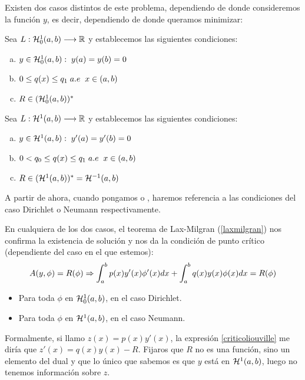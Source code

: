 Existen dos casos distintos de este problema, dependiendo de donde consideremos la función $y$, es decir, dependiendo de donde queramos minimizar:
\begin{definition}
Sea $L : \mathcal{H}_0^{ 1 } (a,b) \longrightarrow \mathbb{R}$ y establecemos las siguientes condiciones:
\begin{enumerate}[(a)]
\item $y\in\mathcal{H}_0^{ 1 } (a,b): \; y(a)=y(b)=0$
\item $0\leq q(x)\leq q_1 \; a.e \;\; x\in(a,b)$
\item $R\in(\mathcal{H}_0^{ 1 } (a,b))^*$
\end{enumerate}
\end{definition}
\begin{definition}
Sea $L : \mathcal{H}^{ 1 } (a,b) \longrightarrow \mathbb{R}$ y establecemos las siguientes condiciones:
\begin{enumerate}[(a)]
\item $y\in\mathcal{H}^{ 1 } (a,b): \; y'(a)=y'(b)=0$
\item $0<q_0\leq q(x)\leq q_1 \; a.e \;\; x\in(a,b)$
\item $R\in(\mathcal{H}^{ 1 } (a,b))^*=\mathcal{H}^{ -1 } (a,b)$
\end{enumerate}
\end{definition}
\begin{remark}
A partir de ahora, cuando pongamos  o , haremos referencia a las condiciones del caso Dirichlet o Neumann respectivamente.
\end{remark}
En cualquiera de los dos casos, el teorema de Lax-Milgran (\ref{laxmilgran}) nos confirma la existencia de solución y nos da la condición de punto crítico (dependiente del caso en el que estemos):
\begin{equation}
\label{criticoliouville}
A(y,\phi)=R(\phi) \Rightarrow \displaystyle\int_{ a }^{ b } p(x)y'(x)\phi'(x)dx+\displaystyle\int_{ a }^{ b } q(x)y(x)\phi(x)dx=R(\phi)
\end{equation}
\begin{itemize}
\item Para toda $\phi$ en $\mathcal{H}_0^{ 1 } (a,b)$, en el caso Dirichlet.
\item Para toda $\phi$ en $\mathcal{H}^{ 1 } (a,b)$, en el caso Neumann.
\end{itemize}
Formalmente, si llamo $z(x)=p(x)y'(x)$, la expresión \eqref{criticoliouville} me diría que $z'(x)=q(x)y(x)-R$. Fijaros que $R$ no es una función, sino un elemento del dual y que lo único que sabemos es que $y$ está en $\mathcal{H}^{ 1 } (a,b)$, luego no tenemos información sobre $z$. 

